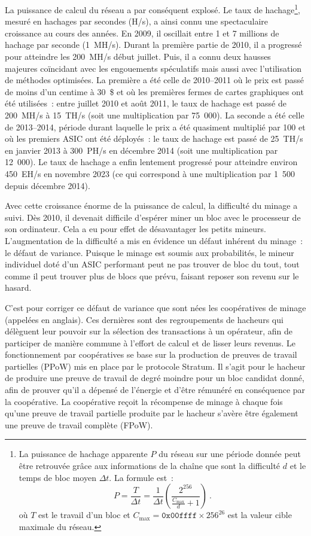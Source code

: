 La puissance de calcul du réseau a par conséquent explosé. Le taux de hachage\footnote{La puissance de hachage apparente $P$ du réseau sur une période donnée peut être retrouvée grâce aux informations de la chaîne que sont la difficulté $d$ et le temps de bloc moyen $\Delta t$. La formule est~: \[
P = \frac{T}{\Delta t} = \frac{1}{\Delta t} \left( \frac{2^{256}}{\frac{C_{\mathrm{max}}}{d} + 1} \right)~.
\] où $T$ est le travail d'un bloc et $C_{\mathrm{max}} = \mathtt{0x00ffff} \times 256^{26}$ est la valeur cible maximale du réseau.}, mesuré en hachages par secondes (H/s), a ainsi connu une spectaculaire croissance au cours des années. En 2009, il oscillait entre 1 et 7 millions de hachage par seconde (1~MH/s). Durant la première partie de 2010, il a progressé pour atteindre les 200~MH/s début juillet. Puis, il a connu deux hausses majeures coïncidant avec les engouements spéculatifs mais aussi avec l'utilisation de méthodes optimisées. La première a été celle de 2010--2011 où le prix est passé de moins d'un centime à 30~\$ et où les premières fermes de cartes graphiques ont été utilisées~: entre juillet 2010 et août 2011, le taux de hachage est passé de 200~MH/s à 15~TH/s (soit une multiplication par 75~000). La seconde a été celle de 2013--2014, période durant laquelle le prix a été quasiment multiplié par 100 et où les premiers ASIC ont été déployés~: le taux de hachage est passé de 25~TH/s en janvier 2013 à 300~PH/s en décembre 2014 (soit une multiplication par 12~000). Le taux de hachage a enfin lentement progressé pour atteindre environ 450~EH/s en novembre 2023 (ce qui correspond à une multiplication par 1~500 depuis décembre 2014).


Avec cette croissance énorme de la puissance de calcul, la difficulté du minage a suivi. Dès 2010, il devenait difficile d'espérer miner un bloc avec le processeur de son ordinateur. Cela a eu pour effet de désavantager les petits mineurs. L'augmentation de la difficulté a mis en évidence un défaut inhérent du minage~: le défaut de variance. Puisque le minage est soumis aux probabilités, le mineur individuel doté d'un ASIC performant peut ne pas trouver de bloc du tout, tout comme il peut trouver plus de blocs que prévu, faisant reposer son revenu sur le hasard.

C'est pour corriger ce défaut de variance que sont nées les coopératives de minage (appelées  en anglais). Ces dernières sont des regroupements de hacheurs qui délèguent leur pouvoir sur la sélection des transactions à un opérateur, afin de participer de manière commune à l'effort de calcul et de lisser leurs revenus. Le fonctionnement par coopératives se base sur la production de preuves de travail partielles (PPoW) mis en place par le protocole Stratum. Il s'agit pour le hacheur de produire une preuve de travail de degré moindre pour un bloc candidat donné, afin de prouver qu'il a dépensé de l'énergie et d'être rémunéré en conséquence par la coopérative. La coopérative reçoit la récompense de minage à chaque fois qu'une preuve de travail partielle produite par le hacheur s'avère être également une preuve de travail complète (FPoW).

